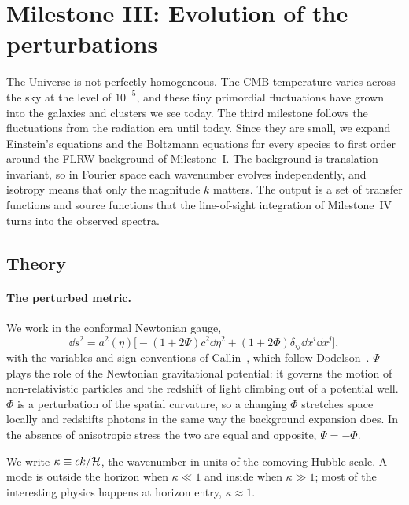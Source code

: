 \section{Milestone III: Evolution of the perturbations}\label{sec:m3}

The Universe is not perfectly homogeneous. The CMB temperature varies across the sky at the level of $10^{-5}$, and
these tiny primordial fluctuations have grown into the galaxies and clusters we see today. The third milestone follows
the fluctuations from the radiation era until today. Since they are small, we expand Einstein's equations and the
Boltzmann equations for every species to first order around the FLRW background of Milestone~I. The background is
translation invariant, so in Fourier space each wavenumber evolves independently, and isotropy means that only the
magnitude $k$ matters. The output is a set of transfer functions and source functions that the line-of-sight
integration of Milestone~IV turns into the observed spectra.

\subsection{Theory}

\paragraph*{The perturbed metric.} We work in the conformal Newtonian gauge,
\begin{equation}
\dd s^2 = a^2(\eta)\big[-(1+2\Psi)c^2\dd\eta^2 + (1+2\Phi)\delta_{ij}\dd x^i\dd x^j\big],
\end{equation}
with the variables and sign conventions of Callin~\cite{Callin2006}, which follow Dodelson~\cite{Dodelson2003}. $\Psi$
plays the role of the Newtonian gravitational potential: it governs the motion of non-relativistic particles and the
redshift of light climbing out of a potential well. $\Phi$ is a perturbation of the spatial curvature, so a changing
$\Phi$ stretches space locally and redshifts photons in the same way the background expansion does. In the absence of
anisotropic stress the two are equal and opposite, $\Psi=-\Phi$.

We write $\kappa\equiv ck/\mathcal{H}$, the wavenumber in units of the comoving Hubble scale. A mode is outside the horizon when
$\kappa\ll1$ and inside when $\kappa\gg1$; most of the interesting physics happens at horizon entry, $\kappa\approx1$.

